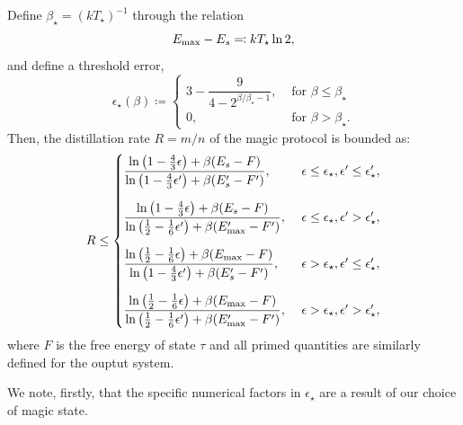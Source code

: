 \documentclass[pra,
aps,
twocolumn,
superscriptaddress,
groupedaddress,
nofootinbib,
reprint
]{revtex4-1}
\begin{document}
\begin{theorem}
Define $\beta_\star = (k T_\star)^{-1}$ through the relation
\begin{equation}
	E_{\rm max} - E_s \eqqcolon kT_\star \ln 2,
\end{equation}
and define a threshold error,
\begin{equation}
	\epsilon_{\star}(\beta) \coloneqq 
	\begin{cases}
		3 - \dfrac{9}{4-2^{\beta/\beta_\star - 1}}, &\text{ for } \beta \leq \beta_\star \\
		0, &\text{ for } \beta > \beta_\star.
	\end{cases}
\end{equation}
Then, the distillation rate $R = m/n$ of the magic protocol is bounded as:
\begin{equation}\label{eq:rate_bounds_proof}
	R \leq
	\begin{cases}
		\dfrac{\ln{\big( 1-\frac{4}{3}\epsilon \big)} + \beta (E_s - F)}{\ln{\big( 1-\frac{4}{3}\epsilon' \big)} + \beta (E'_s - F')},\ &\epsilon \leq \epsilon_\star, \epsilon' \leq \epsilon'_\star, \vspace{10pt}\\
		\dfrac{\ln{\big( 1-\frac{4}{3}\epsilon \big)} + \beta (E_s - F)}{\ln{\big( \frac{1}{2}-\frac{1}{6}\epsilon' \big)} + \beta (E'_{\rm{max}} - F')},\ &\epsilon \leq \epsilon_\star, \epsilon' > \epsilon'_\star, \vspace{10pt}\\
		\dfrac{\ln{\big( \frac{1}{2}-\frac{1}{6}\epsilon \big)} + \beta (E_{\rm{max}} - F)}{\ln{\big( 1-\frac{4}{3}\epsilon' \big)} + \beta (E'_s - F')},\ &\epsilon > \epsilon_\star, \epsilon' \leq \epsilon'_\star, \vspace{10pt}\\
		\dfrac{\ln{\big( \frac{1}{2}-\frac{1}{6}\epsilon \big)} + \beta (E_{\rm{max}} - F)}{\ln{\big( \frac{1}{2}-\frac{1}{6}\epsilon' \big)} + \beta (E'_{\rm{max}} - F')},\ &\epsilon > \epsilon_\star, \epsilon' > \epsilon'_\star,
	\end{cases}
\end{equation}
where $F$ is the free energy of state $\tau$ and all primed quantities are similarly defined for the ouptut system.
\end{theorem}
We note, firstly, that the specific numerical factors in $\epsilon_\star$ are a result of our choice of magic state. 
\end{document}
